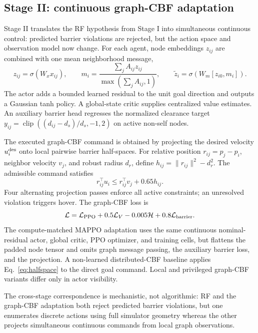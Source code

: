 \documentclass{article}
\begin{document}
\subsection{Stage II: continuous graph-CBF adaptation}
Stage II translates the RF hypothesis from Stage I into simultaneous continuous control: predicted barrier violations are rejected, but the action space and observation model now change. For each agent, node embeddings $z_{ij}$ are combined with one mean neighborhood message,
\begin{equation}
z_{ij}=\sigma(W_x x_{ij}),\qquad
m_i=\frac{\sum_j A_{ij}z_{ij}}{\max(\sum_j A_{ij},1)},\qquad
\tilde z_i=\sigma(W_m[z_{i0},m_i]).
\label{eq:message}
\end{equation}
The actor adds a bounded learned residual to the unit goal direction and outputs a Gaussian tanh policy. A global-state critic supplies centralized value estimates. An auxiliary barrier head regresses the normalized clearance target $y_{ij}=\operatorname{clip}((d_{ij}-d_s)/d_s,-1,2)$ on active non-self nodes.

The executed graph-CBF command is obtained by projecting the desired velocity $u_i^{\rm des}$ onto local pairwise barrier half-spaces. For relative position $r_{ij}=p_j-p_i$, neighbor velocity $v_j$, and robust radius $d_r$, define $h_{ij}=\lVert r_{ij}\rVert^2-d_r^2$. The admissible command satisfies
\begin{equation}
r_{ij}^{\top}u_i\le r_{ij}^{\top}v_j+0.65h_{ij}.
\label{eq:halfspace}
\end{equation}
Four alternating projection passes enforce all active constraints; an unresolved violation triggers hover. The graph-CBF loss is
\begin{equation}
\mathcal L=\mathcal L_{\rm PPO}+0.5\mathcal L_V-0.005\mathcal H+0.8\mathcal L_{\rm barrier}.
\label{eq:loss}
\end{equation}
The compute-matched MAPPO adaptation uses the same continuous nominal-residual actor, global critic, PPO optimizer, and training cells, but flattens the padded node tensor and omits graph message passing, the auxiliary barrier loss, and the projection. A non-learned distributed-CBF baseline applies Eq.~\ref{eq:halfspace} to the direct goal command. Local and privileged graph-CBF variants differ only in actor visibility.

The cross-stage correspondence is mechanistic, not algorithmic: RF and the graph-CBF adaptation both reject predicted barrier violations, but one enumerates discrete actions using full simulator geometry whereas the other projects simultaneous continuous commands from local graph observations.
\end{document}
